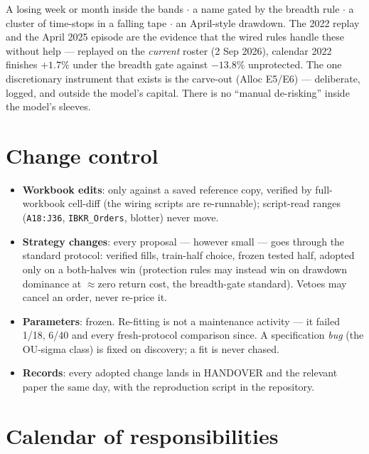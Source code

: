 \documentclass[11pt,a4paper]{article}
\begin{document}
\begin{tcolorbox}[colback=bcnavy!5, colframe=bcnavy, boxrule=0.8pt,
  title={\bfseries Note and wait for the scheduled review}, coltitle=white]
A losing week or month inside the bands $\cdot$ a name gated by the breadth
rule $\cdot$ a cluster of time-stops in a falling tape $\cdot$ an April-style
drawdown. The 2022 replay and the April 2025 episode are the evidence that
the wired rules handle these without help --- replayed on the \emph{current}
roster (2 Sep 2026), calendar 2022 finishes $+1.7\%$ under the breadth gate
against $-13.8\%$ unprotected. The one discretionary instrument
that exists is the carve-out (Alloc E5/E6) --- deliberate, logged, and
outside the model's capital. There is no ``manual de-risking'' inside the
model's sleeves.
\end{tcolorbox}

\section{Change control}

\begin{itemize}[leftmargin=1.6em, itemsep=2pt]
\item \textbf{Workbook edits}: only against a saved reference copy, verified
      by full-workbook cell-diff (the wiring scripts are re-runnable);
      script-read ranges (\texttt{A18:J36}, \texttt{IBKR\_Orders}, blotter)
      never move.
\item \textbf{Strategy changes}: every proposal --- however small --- goes
      through the standard protocol: verified fills, train-half choice,
      frozen tested half, adopted only on a both-halves win (protection
      rules may instead win on drawdown dominance at $\approx$zero return
      cost, the breadth-gate standard). Vetoes may cancel an order, never
      re-price it.
\item \textbf{Parameters}: frozen. Re-fitting is not a maintenance activity
      --- it failed 1/18, 6/40 and every fresh-protocol comparison since.
      A specification \emph{bug} (the OU-sigma class) is fixed on
      discovery; a fit is never chased.
\item \textbf{Records}: every adopted change lands in HANDOVER and the
      relevant paper the same day, with the reproduction script in the
      repository.
\end{itemize}

\section{Calendar of responsibilities}
\end{document}
